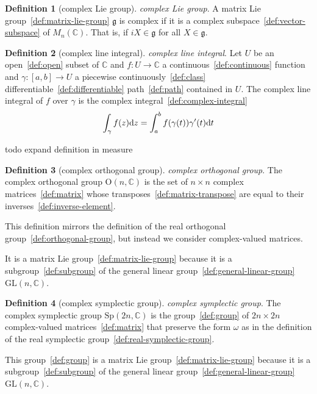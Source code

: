 \documentclass[12pt,a4paper]{article}
\theoremstyle{definition}
\newtheorem{definition}{Definition}
\begin{document}
\begin{definition}[complex Lie group]\label{def:complex-lie-group}
\emph{complex Lie group}. A matrix Lie group~\ref{def:matrix-lie-group} $\mathfrak g$ is complex if it is a complex subspace~\ref{def:vector-subspace} of $M_n(\mathbb C)$. That is, if $iX\in \mathfrak g$ for all $X\in \mathfrak g$.
\end{definition}

\begin{definition}[complex line integral]\label{def:complex-line-integral}
\emph{complex line integral}. Let $U$ be an open~\ref{def:open} subset of $\mathbb C$ and $f:U \to  \mathbb C$ a continuous~\ref{def:continuous} function and $\gamma:[a,b]\to U$ a piecewise continuously~\ref{def:class} differentiable~\ref{def:differentiable} path~\ref{def:path} contained in $U$. The complex line integral of $f$ over $\gamma$ is the complex integral~\ref{def:complex-integral} $$\int_\gamma f(z)\text dz = \int_a^b f(\gamma(t))\gamma'(t)\text dt$$

todo expand definition in measure
\end{definition}

\begin{definition}[complex orthogonal group]\label{def:complex-orthogonal-group}
\emph{complex orthogonal group}. The complex orthogonal group $\text{O}(n,\mathbb C)$ is the set of $n\times n$ complex matrices~\ref{def:matrix} whose transposes~\ref{def:matrix-transpose} are equal to their inverses~\ref{def:inverse-element}. 

This definition mirrors the definition of the real orthogonal group~\ref{def:orthogonal-group}, but instead we consider complex-valued matrices.

It is a matrix Lie group~\ref{def:matrix-lie-group} because it is a subgroup~\ref{def:subgroup} of the general linear group~\ref{def:general-linear-group} $\text{GL}(n,\mathbb C)$.
\end{definition}

\begin{definition}[complex symplectic group]\label{def:complex-symplectic-group}
\emph{complex symplectic group}. The complex symplectic group $\text{Sp}(2n,\mathbb C)$ is the group~\ref{def:group} of $2n\times 2n$ complex-valued matrices~\ref{def:matrix} that preserve the form $\omega$ as in the definition of the real symplectic group~\ref{def:real-symplectic-group}.

This group~\ref{def:group} is a matrix Lie group~\ref{def:matrix-lie-group} because it is a subgroup~\ref{def:subgroup} of the general linear group~\ref{def:general-linear-group} $\text{GL}(n,\mathbb C)$.
\end{definition}
\end{document}
